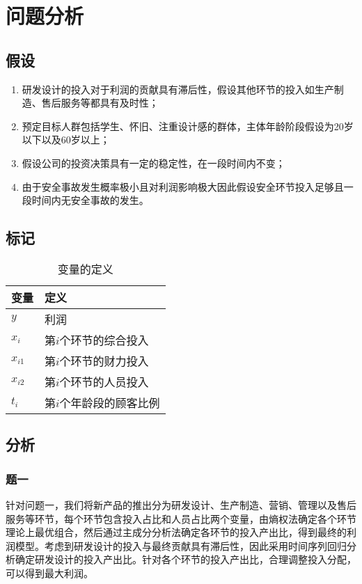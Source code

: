 \documentclass{article}
\begin{document}
\fi
\clearpage
\section{问题分析}
\subsection{假设}
\begin{enumerate}
	\item 研发设计的投入对于利润的贡献具有滞后性，假设其他环节的投入如生产制造、售后服务等都具有及时性；
	\item 预定目标人群包括学生、怀旧、注重设计感的群体，主体年龄阶段假设为20岁以下以及60岁以上；
	\item 假设公司的投资决策具有一定的稳定性，在一段时间内不变；
	\item 由于安全事故发生概率极小且对利润影响极大因此假设安全环节投入足够且一段时间内无安全事故的发生。
\end{enumerate}
\subsection{标记}
\begin{table}[htbp]
	\centering
	\caption{变量的定义}
	\begin{tabu}spread0pt{X[c]X[l]}
		\toprule
		变量&	定义\\
		\midrule
		\(y\)&利润\\
		\(x_i\)&第\(i\)个环节的综合投入\\
		\(x_{i1}\)&第\(i\)个环节的财力投入\\
		\(x_{i2}\)&第\(i\)个环节的人员投入\\
		\(t_i\)&第\(i\)个年龄段的顾客比例\\
		\bottomrule
	\end{tabu}
\end{table}
\subsection{分析}
\subsubsection{题一}
针对问题一，我们将新产品的推出分为研发设计、生产制造、营销、管理以及售后服务等环节，每个环节包含投入占比和人员占比两个变量，由熵权法确定各个环节理论上最优组合，然后通过主成分分析法确定各环节的投入产出比，得到最终的利润模型。考虑到研发设计的投入与最终贡献具有滞后性，因此采用时间序列回归分析确定研发设计的投入产出比。针对各个环节的投入产出比，合理调整投入分配，可以得到最大利润。
\end{document}
